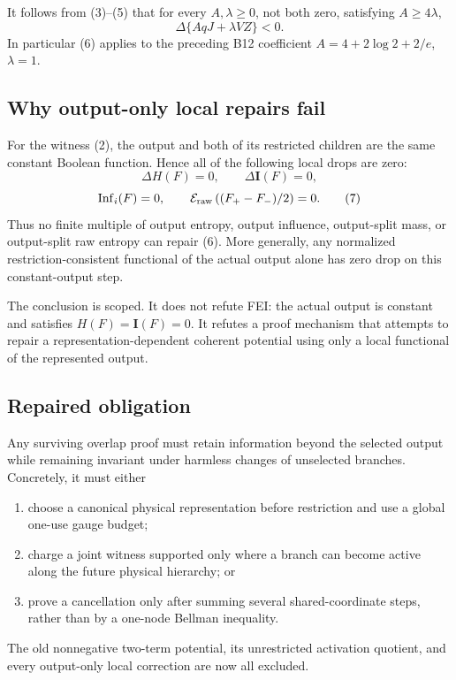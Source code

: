It follows from (3)--(5) that for every $A,\lambda\ge0$, not both zero,
satisfying $A\ge4\lambda$,
\[
 \Delta\{AqJ+\lambda VZ\}<0.                                 \tag{6}
\]
In particular (6) applies to the preceding B12 coefficient
$A=4+2\log2+2/e$, $\lambda=1$.

\subsection*{Why output-only local repairs fail}

For the witness (2), the output and both of its restricted children are the
same constant Boolean function.  Hence all of the following local drops are
zero:
\[
 \Delta H(F)=0,\qquad \Delta\mathbf I(F)=0,
\]
\[
 \operatorname{Inf}_i(F)=0,\qquad
 {\cal E}_{\rm raw}\left((F_+-F_-)/2\right)=0.                \tag{7}
\]
Thus no finite multiple of output entropy, output influence, output-split
mass, or output-split raw entropy can repair (6).  More generally, any
normalized restriction-consistent functional of the actual output alone has
zero drop on this constant-output step.

The conclusion is scoped.  It does not refute FEI: the actual output is
constant and satisfies $H(F)=\mathbf I(F)=0$.  It refutes a proof mechanism
that attempts to repair a representation-dependent coherent potential using
only a local functional of the represented output.

\subsection*{Repaired obligation}

Any surviving overlap proof must retain information beyond the selected
output while remaining invariant under harmless changes of unselected
branches.  Concretely, it must either
\begin{enumerate}
\item choose a canonical physical representation before restriction and use
      a global one-use gauge budget;
\item charge a joint witness supported only where a branch can become active
      along the future physical hierarchy; or
\item prove a cancellation only after summing several shared-coordinate
      steps, rather than by a one-node Bellman inequality.
\end{enumerate}
The old nonnegative two-term potential, its unrestricted activation quotient,
and every output-only local correction are now all excluded.
